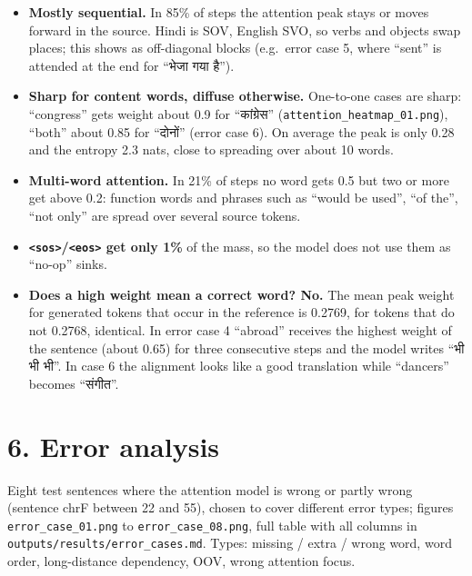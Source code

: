 \documentclass[10pt,a4paper]{article}
\DeclareRobustCommand{\hi}[1]{{\hindifont #1}}
\providecommand{\tightlist}{\setlength{\itemsep}{0pt}\setlength{\parskip}{0pt}}
\begin{document}
\begin{itemize}
\tightlist
\item
  \textbf{Mostly sequential.} In 85\% of steps the attention peak stays or moves forward in the source. Hindi is SOV, English SVO, so verbs and objects swap places; this shows as off-diagonal blocks (e.g.~error case 5, where ``sent'' is attended at the end for ``\hi{भेजा गया है}'').
\item
  \textbf{Sharp for content words, diffuse otherwise.} One-to-one cases are sharp: ``congress'' gets weight about 0.9 for ``\hi{कांग्रेस}'' (\texttt{attention\_heatmap\_01.png}), ``both'' about 0.85 for ``\hi{दोनों}'' (error case 6). On average the peak is only 0.28 and the entropy 2.3 nats, close to spreading over about 10 words.
\item
  \textbf{Multi-word attention.} In 21\% of steps no word gets 0.5 but two or more get above 0.2: function words and phrases such as ``would be used'', ``of the'', ``not only'' are spread over several source tokens.
\item
  \textbf{\texttt{\textless{}sos\textgreater{}}/\texttt{\textless{}eos\textgreater{}} get only 1\%} of the mass, so the model does not use them as ``no-op'' sinks.
\item
  \textbf{Does a high weight mean a correct word? No.} The mean peak weight for generated tokens that occur in the reference is 0.2769, for tokens that do not 0.2768, identical. In error case 4 ``abroad'' receives the highest weight of the sentence (about 0.65) for three consecutive steps and the model writes ``\hi{भी भी भी}''. In case 6 the alignment looks like a good translation while ``dancers'' becomes ``\hi{संगीत}''.
\end{itemize}

\hypertarget{error-analysis}{%
\section{6. Error analysis}\label{error-analysis}}

Eight test sentences where the attention model is wrong or partly wrong (sentence chrF between 22 and 55), chosen to cover different error types; figures \texttt{error\_case\_01.png} to \texttt{error\_case\_08.png}, full table with all columns in \texttt{outputs/results/error\_cases.md}. Types: missing / extra / wrong word, word order, long-distance dependency, OOV, wrong attention focus.
\end{document}
